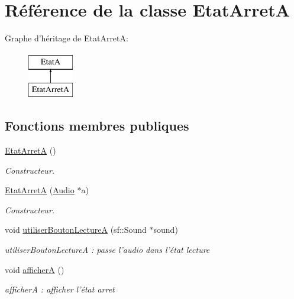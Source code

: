 \hypertarget{classEtatArretA}{\section{Référence de la classe Etat\+Arret\+A}
\label{classEtatArretA}
}
Graphe d'héritage de Etat\+Arret\+A\+:\begin{figure}[H]
\begin{center}
\leavevmode
\includegraphics[height=2.000000cm]{classEtatArretA}
\end{center}
\end{figure}
\subsection*{Fonctions membres publiques}
\begin{DoxyCompactItemize}
\item 
\hypertarget{classEtatArretA_a283a80478fd920238ba7152d0cdfea5c}{\hyperlink{classEtatArretA_a283a80478fd920238ba7152d0cdfea5c}{Etat\+Arret\+A} ()}\label{classEtatArretA_a283a80478fd920238ba7152d0cdfea5c}

\begin{DoxyCompactList}\small\item\em Constructeur. \end{DoxyCompactList}\item 
\hyperlink{classEtatArretA_aa5235b55db8f80efd91b2ee3bbd842de}{Etat\+Arret\+A} (\hyperlink{classAudio}{Audio} $\ast$a)
\begin{DoxyCompactList}\small\item\em Constructeur. \end{DoxyCompactList}\item 
\hypertarget{classEtatArretA_a56aef7900e5a00efc1915b263522fffd}{void \hyperlink{classEtatArretA_a56aef7900e5a00efc1915b263522fffd}{utiliser\+Bouton\+Lecture\+A} (sf\+::\+Sound $\ast$sound)}\label{classEtatArretA_a56aef7900e5a00efc1915b263522fffd}

\begin{DoxyCompactList}\small\item\em utiliser\+Bouton\+Lecture\+A \+: passe l'audio dans l'état lecture \end{DoxyCompactList}\item 
\hypertarget{classEtatArretA_a44b510722d620d74ed69b7bba4208558}{void \hyperlink{classEtatArretA_a44b510722d620d74ed69b7bba4208558}{afficher\+A} ()}\label{classEtatArretA_a44b510722d620d74ed69b7bba4208558}

\begin{DoxyCompactList}\small\item\em afficher\+A \+: afficher l'état arret \end{DoxyCompactList}\end{DoxyCompactItemize}


